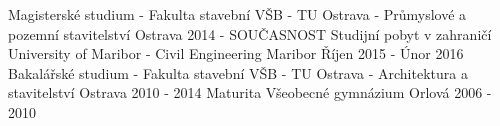 

\begin{cventries}

  \cventry
    {Magisterské studium - Fakulta stavební}
    {VŠB - TU Ostrava - Průmyslové a pozemní stavitelství}
    {Ostrava}
    {2014 - SOUČASNOST}
    {}
  \cventry
    {Studijní pobyt v zahraničí}
    {University of Maribor - Civil Engineering}
    {Maribor}
    {Říjen 2015 - Únor 2016}
    {}
  \cventry
    {Bakalářské studium - Fakulta stavební} %
    {VŠB - TU Ostrava - Architektura a stavitelství} %
    {Ostrava} %
    {2010 - 2014} %
    {}
  \cventry
    {Maturita} %
    {Všeobecné gymnázium} %
    {Orlová} %
    {2006 - 2010} %
    {}
    
    

\end{cventries}
